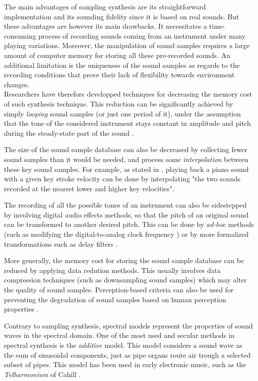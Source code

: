 {{The main advantages of sampling synthesis are its straightforward implementation and its sounding fidelity since it is based on real sounds. But these advantages are however its main drawbacks. It necessitates a time-consuming process of recording sounds coming from an instrument under many playing variations. Moreover, the manipulation of sound samples requires a large amount of computer memory for storing all these pre-recorded sounds. An additional limitation is the uniqueness of the sound samples as regards to the recording conditions that prove their lack of flexibility towards environment changes.\\

Researchers have therefore developped techniques for decreasing the memory cost of such synthesis technique. This reduction can be significantly achieved by simply \emph{looping} sound samples (or just one period of it), under the assumption that the tone of the considered instrument stays constant in amplitude and pitch during the steady-state part of the sound .

The size of the sound sample database can also be decreased by collecting fewer sound samples than it would be needed, and process some \emph{interpolation} between these key sound samples. For example, as stated in , playing back a piano sound with a given key stroke velocity can be done by interpolating "the two sounds recorded at the nearest lower and higher key velocities".

The recording of all the possible tones of an instrument can also be sidestepped by involving digital audio effects methods, so that the pitch of an original sound can be transformed to another desired pitch. This can be done by \emph{ad-hoc} methods (such as modifying the digital-to-analog clock frequency ) or by more formalized transformations such as delay filters . 

More generally, the memory cost for storing the sound sample database can be reduced by applying data redution methods. This usually involves data compression techniques (such as downsampling sound samples) which may alter the quality of sound samples. Perception-based criteria can also be used for preventing the degradation of sound samples based on human perception properties .


				\label{subsubsubsec:CM_SS_Desc_Spectral}

Contrary to sampling synthesis, spectral models represent the properties of sound waves in the spectral domain. One of the most used and secular methods in spectral synthesis is the \emph{additive} model. This model considers a sound wave as the sum of sinusoidal components, just as pipe organs route air trough a selected subset of pipes. This model has been used in early electronic music, such as the \emph{Telharmonium} of Cahill .\\ 

}}
